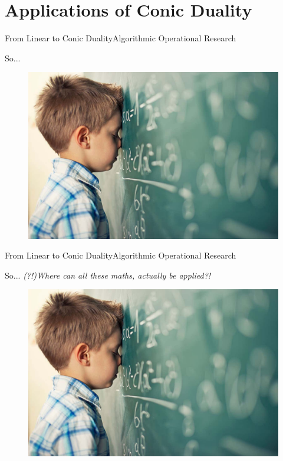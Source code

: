 \documentclass[11pt,aspectratio=169]{beamer}
\newcommand{\TT}{From Linear to Conic Duality}
\newcommand{\TL}{Algorithmic Operational Research}
\newcommand{\PIII}{Applications of Conic Duality}
\begin{document}
\section{\PIII}
\begin{frame}{\TT}{\TL}
 \begin{block}{So...}
\Large
\vspace{7.5mm}
\begin{figure}
\begin{center}
  \includegraphics[scale = 0.2]{maths.jpg}
 \end{center}
\end{figure}
 \end{block}
\end{frame}

\begin{frame}{\TT}{\TL}
 \begin{block}{So...}
\Large
\textit{(?!)Where can all these maths, actually be applied?!} 
\begin{figure}
\begin{center}
  \includegraphics[scale = 0.2]{maths.jpg}
 \end{center}
\end{figure}
 \end{block}
\end{frame}
\end{document}
